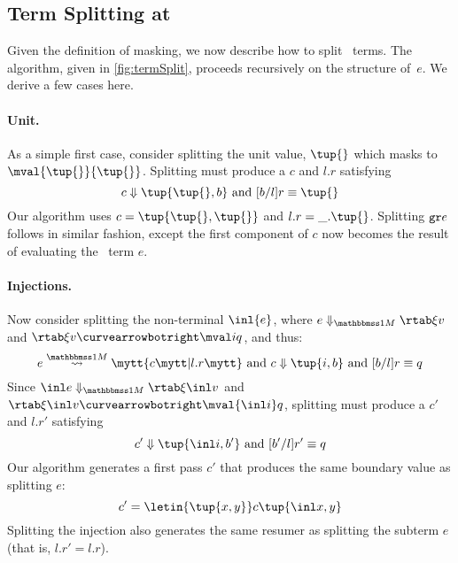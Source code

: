 \begin{abstrsyn}



\subsection{Term Splitting at \bbonem}
\label{sec:split-one}

Given the definition of masking, we now describe how to split
\bbonem\ terms. The algorithm, given in \cref{fig:termSplit}, proceeds
recursively on the structure of~$e$. We derive a few cases here.

\paragraph {Unit.} 
As a simple first case, consider splitting the unit value, $\tup{}$
which masks to $\mval {\tup{}} {\tup{}}$.
Splitting must produce a $c$ and $l.r$ satisfying
\[
	\reduce c {\tup{\tup{},b}} \text{ and } [b/l]r \equiv \tup{}
\]
Our algorithm uses $c=\tup{\tup{},\tup{}}$ and $l.r = \_.\tup{}$.
Splitting ${\tt gr}{e}$ follows in similar fashion, except the first 
component of $c$ now becomes the result of evaluating the \bbonep\ term $e$.

\paragraph {Injections.}
Now consider splitting the non-terminal $\inl {e}$, where $\diaone
{e} \xi v$ and $\rtab \xi v \vsplito \mval i q$, and thus:
\[
	\splitone e A c {l.r} \text{ and } \reduce c {\tup{i,b}} \text{ and } [b/l]r \equiv q
\]
Since $\diaone {\inl e} \xi {\inl v}$ and $\rtab \xi {\inl v} \vsplito \mval {\inl i} q$,
splitting must produce a $c'$ and $l.r'$ satisfying
\[
	\reduce {c'} {\tup{\inl i,b'}} \text{ and } [b'/l]r' \equiv q
\]
Our algorithm generates a first pass $c'$ that produces the same
boundary value as splitting $e$:
\[
c' = \letin {\tup {x,y}} c {\tup{\inl x, y}}
\]
Splitting the injection also generates the same resumer as splitting
the subterm $e$ (that is, $l.r' = l.r$).


\end{abstrsyn}
